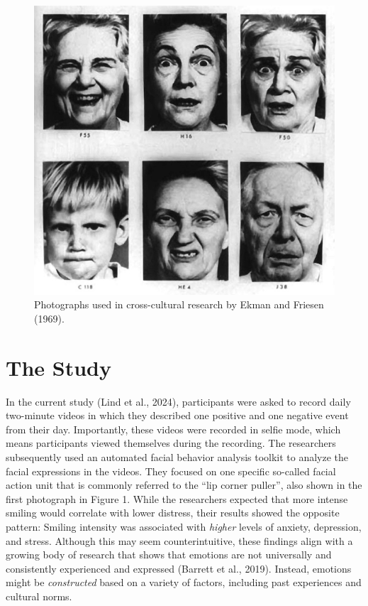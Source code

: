 \documentclass[authordate, reflection,issue]{jote-new-article}
\begin{document}
	\begin{figure}
		\includegraphics[width=\linewidth]{media/image1.jpeg}

		\caption{Photographs used in cross-cultural research by Ekman and Friesen (1969).}

		\label{fig:rId6}


	\end{figure}







	\section{The Study }



	In the current study (Lind et al., 2024), participants were asked to record daily two-minute videos in which they described one positive and one negative event from their day. Importantly, these videos were recorded in selfie mode, which means participants viewed themselves during the recording. The researchers subsequently used an automated facial behavior analysis toolkit to analyze the facial expressions in the videos. They focused on one specific so-called facial action unit that is commonly referred to the “lip corner puller”, also shown in the first photograph in Figure 1. While the researchers expected that more intense smiling would correlate with lower distress, their results showed the opposite pattern: Smiling intensity was associated with \emph{higher} levels of anxiety, depression, and stress. Although this may seem counterintuitive, these findings align with a growing body of research that shows that emotions are not universally and consistently experienced and expressed (Barrett et al., 2019). Instead, emotions might be \emph{constructed} based on a variety of factors, including past experiences and cultural norms.
\end{document}
